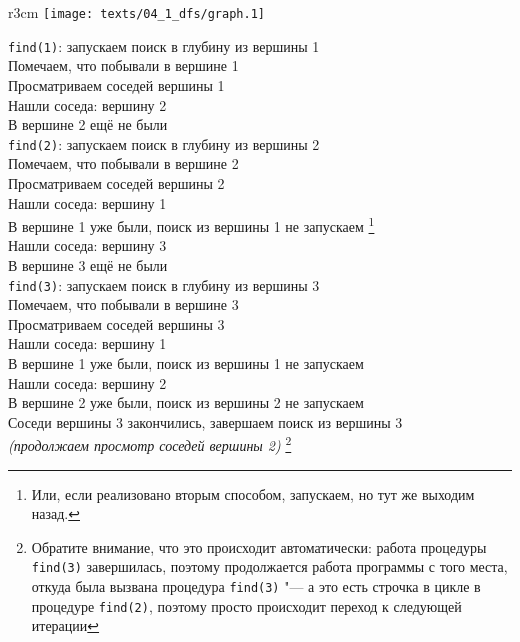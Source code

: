 \begin{wrapfigure}{r}{3cm}
\vspace{-0.3cm}
\texttt{[image: texts/04\_1\_dfs/graph.1]}
\end{wrapfigure}
{\newcommand{\ind}{\hspace*{1cm}}\footnotesize

\noindent \texttt{find(1)}: запускаем поиск в глубину из вершины 1\\
Помечаем, что побывали в вершине 1\\
Просматриваем соседей вершины 1\\
Нашли соседа: вершину 2\\
В вершине 2 ещё не были\\
\ind \texttt{find(2)}: запускаем поиск в глубину из вершины 2\\
\ind Помечаем, что побывали в вершине 2\\
\ind Просматриваем соседей вершины 2\\
\ind Нашли соседа: вершину 1\\
\ind В вершине 1 уже были, поиск из вершины 1 не запускаем%
       \footnote{Или, если реализовано вторым 
         способом, запускаем, но тут же выходим назад.}%
        \\
\ind Нашли соседа: вершину 3\\
\ind В вершине 3 ещё не были\\
\ind \ind \texttt{find(3)}: запускаем поиск в глубину из вершины 3\\
\ind \ind Помечаем, что побывали в вершине 3\\
\ind \ind Просматриваем соседей вершины 3\\
\ind \ind Нашли соседа: вершину 1\\
\ind \ind В вершине 1 уже были, поиск из вершины 1 не запускаем\\
\ind \ind Нашли соседа: вершину 2\\
\ind \ind В вершине 2 уже были, поиск из вершины 2 не запускаем\\
\ind \ind Соседи вершины 3 закончились, завершаем поиск из вершины 3\\
\ind \textit{(продолжаем просмотр соседей вершины 2)}%
       \footnote{Обратите внимание, что это происходит автоматически: работа процедуры 
              \texttt{find(3)} завершилась, поэтому продолжается работа программы с того места, 
              откуда была вызвана процедура \texttt{find(3)} "--- а это есть строчка в цикле в 
              процедуре \texttt{find(2)}, поэтому просто происходит переход к следующей итерации 
}}
